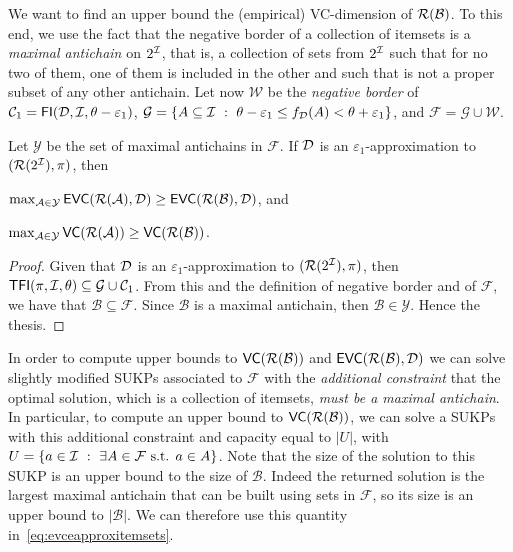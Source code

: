 We want to find an upper bound the (empirical) VC-dimension of
$\mathcal{R}(\mathcal{B})$. To this end, we use the fact that the negative border of
a collection of itemsets is a \emph{maximal antichain} on $2^{\cal I}$, that is, a
collection of sets from $2^{\cal I}$ such that for no two of them, one of them is
included in the other and such that is not a proper subset of any other
antichain. Let now $\mathcal{W}$ be the \emph{negative border} of
$\mathcal{C}_1=\mathsf{FI}({\cal D},{\cal I},\theta-\varepsilon_1)$,
$\mathcal{G}=\{A\subseteq{\cal I} ~:~ \theta-\varepsilon_1\le
f_{\cal D}(A)<\theta+\varepsilon_1\}$, and $\mathcal{F}=\mathcal{G}\cup\mathcal{W}$.

\begin{lemma}\label{lem:antichains}
  Let $\mathcal{Y}$ be the set of maximal antichains in $\mathcal{F}$. If
  ${\cal D}$ is an $\varepsilon_1$-approximation to $(\mathcal{R}(2^{\cal I}),\pi)$, then
  \begin{enumerate*}
    \item
      $\max_{\mathcal{A}\in\mathcal{Y}}\mathsf{EVC}(\mathcal{R}(\mathcal{A}),{\cal D})\ge\mathsf{EVC}(\mathcal{R}(\mathcal{B}),{\cal D})$,
      and
    \item
      $\max_{\mathcal{A}\in\mathcal{Y}}\mathsf{VC}(\mathcal{R}(\mathcal{A}))\ge\mathsf{VC}(\mathcal{R}(\mathcal{B}))$.
  \end{enumerate*}
\end{lemma}

\begin{proof}
  Given that ${\cal D}$ is an $\varepsilon_1$-approximation to
  $(\mathcal{R}(2^{\cal I}),\pi)$, then
  $\mathsf{TFI}(\pi,{\cal I},\theta)\subseteq\mathcal{G}\cup\mathcal{C}_1$.  From this and
  the definition of negative border and of $\mathcal{F}$, we have that
  $\mathcal{B}\subseteq\mathcal{F}$. Since $\mathcal{B}$ is a maximal antichain,
  then $\mathcal{B}\in\mathcal{Y}$. Hence the thesis.
\end{proof}

In order to compute upper bounds to $\mathsf{VC}(\mathcal{R}(\mathcal{B}))$ and
$\mathsf{EVC}(\mathcal{R}(\mathcal{B}),{\cal D})$ we can solve slightly modified SUKPs
associated to $\mathcal{F}$ with the \emph{additional constraint} that the
optimal solution, which is a collection of itemsets, \emph{must be a maximal
antichain}. In particular, to compute an upper bound to
$\mathsf{VC}(\mathcal{R}(\mathcal{B}))$, we can solve a SUKPs with this additional constraint
and capacity equal to $|U|$, with $U=\{a\in{\cal I} ~:~ \exists A\in\mathcal{F}
\mbox{ s.t. } a\in A\}$. Note that the size of the solution to this SUKP is an
upper bound to the size of $\mathcal{B}$. Indeed the returned solution is the
largest maximal antichain that can be built using sets in $\mathcal{F}$, so its
size is an upper bound to $|\mathcal{B}|$. We can therefore use this quantity
in~\eqref{eq:evceapproxitemsets}.

